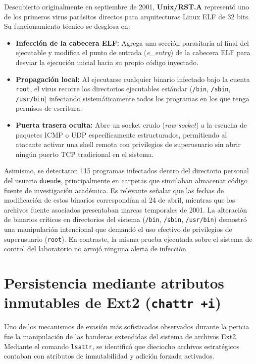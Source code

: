 \begin{notaforense}
Descubierto originalmente en septiembre de 2001, \textbf{Unix/RST.A} representó uno de los primeros virus parásitos directos para arquitecturas Linux ELF de 32 bits. Su funcionamiento técnico se desglosa en:
\begin{itemize}
    \item \textbf{Infección de la cabecera ELF:} Agrega una sección parasitaria al final del ejecutable y modifica el punto de entrada (\textit{e\_entry}) de la cabecera ELF para desviar la ejecución inicial hacia su propio código inyectado.
    \item \textbf{Propagación local:} Al ejecutarse cualquier binario infectado bajo la cuenta \texttt{root}, el virus recorre los directorios ejecutables estándar (\texttt{/bin}, \texttt{/sbin}, \texttt{/usr/bin}) infectando sistemáticamente todos los programas en los que tenga permisos de escritura.
    \item \textbf{Puerta trasera oculta:} Abre un socket crudo (\textit{raw socket}) a la escucha de paquetes ICMP o UDP específicamente estructurados, permitiendo al atacante activar una shell remota con privilegios de superusuario sin abrir ningún puerto TCP tradicional en el sistema.
\end{itemize}
\end{notaforense}

Asimismo, se detectaron 115 programas infectados dentro del directorio personal del usuario \texttt{duende}, principalmente en carpetas que simulaban almacenar código fuente de investigación académica. Es relevante señalar que las fechas de modificación de estos binarios correspondían al 24 de abril, mientras que los archivos fuente asociados presentaban marcas temporales de 2001. La alteración de binarios críticos en directorios del sistema (\texttt{/bin}, \texttt{/sbin}, \texttt{/usr/bin}) demostró una manipulación intencional que demandó el uso efectivo de privilegios de superusuario (\texttt{root}). En contraste, la misma prueba ejecutada sobre el sistema de control del laboratorio no arrojó ninguna alerta de infección.

\section{Persistencia mediante atributos inmutables de Ext2 (\texttt{chattr +i})}

Uno de los mecanismos de evasión más sofisticados observados durante la pericia fue la manipulación de las banderas extendidas del sistema de archivos Ext2. Mediante el comando \texttt{lsattr}, se identificó que dieciocho archivos estratégicos contaban con atributos de inmutabilidad y adición forzada activados.

